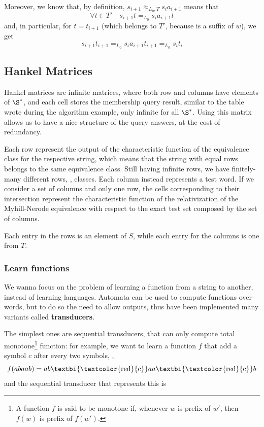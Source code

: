 \documentclass[oneside]{academica}
\begin{document}
\begin{proof*}
  Moreover, we know that, by definition, $s_{i+1} \approx_{L_0,T} s_i a_{i+1}$ means that
  \begin{equation*}
    \forall t \in T' \quad s_{i+1} t =_{L_0} s_i a_{i+1} t
  \end{equation*}
  and, in particular, for $t = t_{i+1}$ (which belongs to $T'$, because is a suffix of $w$), we get
  \begin{equation*}
    s_{i+1} t_{i+1} =_{L_0} s_i a_{i+1} t_{i+1} =_{L_0} s_i t_i
  \end{equation*}
\end{proof*}

\subsection{Hankel Matrices}

Hankel matrices are infinite matrices, where both row and columns have elements of $\S^*$, and each cell stores the membership query result, similar to the table wrote during the algorithm example, only infinite for all $\S^*$.
Using this matrix allows us to have a nice structure of the query answers, at the cost of redundancy.

Each row represent the output of the characteristic function of the equivalence class for the respective string, which means that the string with equal rows belongs to the same equivalence class.
Still having infinite rows, we have finitely-many different rows, \ie, classes.
Each column instead represents a test word.
If we consider a set of columns and only one row, the cells corresponding to their intersection represent the characteristic function of the relativization of the Myhill-Nerode equivalence with respect to the exact test set composed by the set of columns.

Each entry in the rows is an element of $S$, while each entry for the columns is one from $T$.

\subsubsection{Learn functions}

We wanna focus on the problem of learning a function from a string to another, instead of learning languages.
Automata can be used to compute functions over words, but to do so the need to allow outputs, thus have been implemented many variants called \textbf{transducers}.

The simplest ones are sequential transducers, that can only compute total monotone\footnote{A function $f$ is said to be monotone if, whenever $w$ is prefix of $w'$, then $f(w)$ is prefix of $f(w')$.} function: for example, we want to learn a function $f$ that add a symbol $c$ after every two symbols, \ie,
\begin{equation*}
  f(abaab) = ab\text{\textbi{\textcolor{red}{c}}}aa\text{\textbi{\textcolor{red}{c}}}b
\end{equation*}
and the sequential transducer that represents this is
\begin{center}
  
\end{center}
\end{document}
